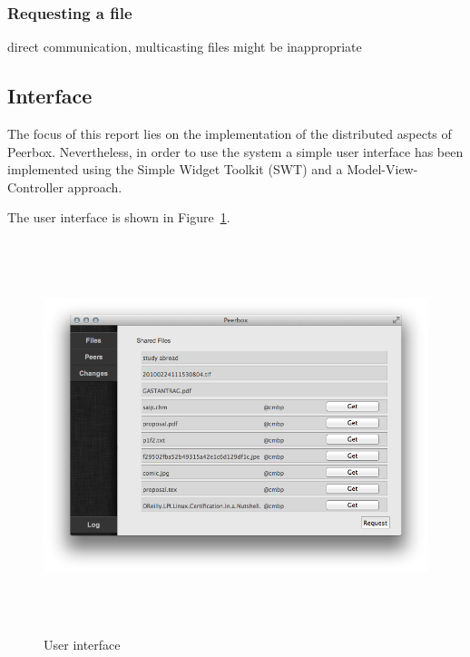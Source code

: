     \subsubsection{Requesting a file}
    direct communication, multicasting files might be inappropriate
        
    

\subsection{Interface}
The focus of this report lies on the implementation of the distributed aspects of Peerbox. Nevertheless, in order to use the system a simple user interface has been implemented using the Simple Widget Toolkit (SWT) and a Model-View-Controller approach. 

The user interface is shown in Figure~\ref{fig:figures_gui}.

\begin{figure}[htbp]
    \centering
        \includegraphics[height=4.5in]{figures/gui.png}
    \caption{User interface}
    \label{fig:figures_gui}
\end{figure}

